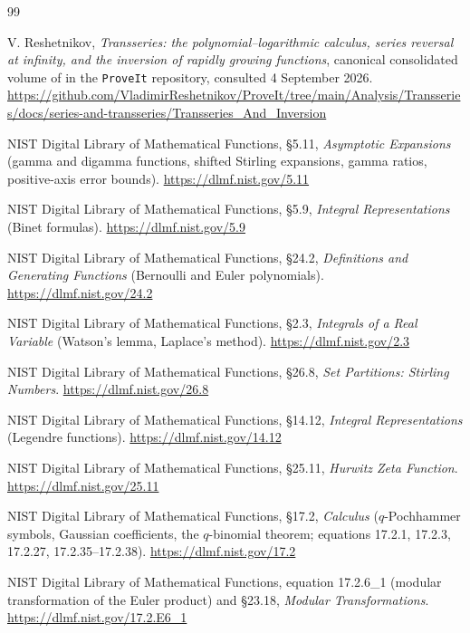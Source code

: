\documentclass[11pt,openany]{book}
\numberwithin{equation}{chapter}
\theoremstyle{plain}
\theoremstyle{definition}
\theoremstyle{remark}
\begin{document}
\backmatter
\begin{thebibliography}{99}
\small
\setlength{\itemsep}{0.25em}

V. Reshetnikov, \emph{Transseries: the polynomial--logarithmic calculus,
series reversal at infinity, and the inversion of rapidly growing
functions}, canonical consolidated volume of
 in the
\texttt{ProveIt} repository, consulted 4 September 2026.
\url{https://github.com/VladimirReshetnikov/ProveIt/tree/main/Analysis/Transseries/docs/series-and-transseries/Transseries_And_Inversion}

NIST Digital Library of Mathematical Functions, \S5.11, \emph{Asymptotic Expansions} (gamma and digamma functions, shifted Stirling expansions, gamma ratios, positive-axis error bounds). \url{https://dlmf.nist.gov/5.11}

NIST Digital Library of Mathematical Functions, \S5.9, \emph{Integral Representations} (Binet formulas). \url{https://dlmf.nist.gov/5.9}

NIST Digital Library of Mathematical Functions, \S24.2, \emph{Definitions and Generating Functions} (Bernoulli and Euler polynomials). \url{https://dlmf.nist.gov/24.2}

NIST Digital Library of Mathematical Functions, \S2.3, \emph{Integrals of a Real Variable} (Watson's lemma, Laplace's method). \url{https://dlmf.nist.gov/2.3}

NIST Digital Library of Mathematical Functions, \S26.8, \emph{Set Partitions: Stirling Numbers}. \url{https://dlmf.nist.gov/26.8}

NIST Digital Library of Mathematical Functions, \S14.12, \emph{Integral Representations} (Legendre functions). \url{https://dlmf.nist.gov/14.12}

NIST Digital Library of Mathematical Functions, \S25.11, \emph{Hurwitz Zeta Function}. \url{https://dlmf.nist.gov/25.11}

NIST Digital Library of Mathematical Functions, \S17.2, \emph{Calculus} ($q$-Pochhammer symbols, Gaussian coefficients, the $q$-binomial theorem; equations 17.2.1, 17.2.3, 17.2.27, 17.2.35--17.2.38). \url{https://dlmf.nist.gov/17.2}

NIST Digital Library of Mathematical Functions, equation 17.2.6\_1 (modular transformation of the Euler product) and \S23.18, \emph{Modular Transformations}. \url{https://dlmf.nist.gov/17.2.E6_1}


\end{thebibliography}
\end{document}
